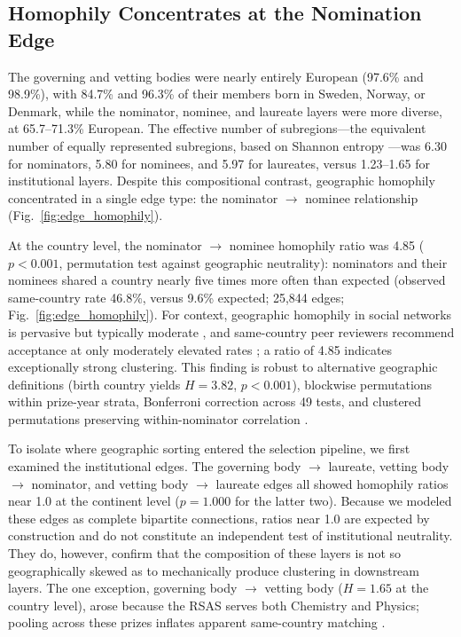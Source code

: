 \documentclass[12pt]{article}
\begin{document}
\subsection*{Homophily Concentrates at the Nomination Edge}

The governing and vetting bodies were nearly entirely European (97.6\% and 98.9\%), with 84.7\% and 96.3\% of their members born in Sweden, Norway, or Denmark, while the nominator, nominee, and laureate layers were more diverse, at 65.7--71.3\% European. The effective number of subregions---the equivalent number of equally represented subregions, based on Shannon entropy \cite{methods}---was 6.30 for nominators, 5.80 for nominees, and 5.97 for laureates, versus 1.23--1.65 for institutional layers. Despite this compositional contrast, geographic homophily concentrated in a single edge type: the nominator $\to$ nominee relationship (Fig.~\ref{fig:edge_homophily}).

At the country level, the nominator $\to$ nominee homophily ratio was 4.85 ($p < 0.001$, permutation test against geographic neutrality): nominators and their nominees shared a country nearly five times more often than expected (observed same-country rate 46.8\%, versus 9.6\% expected; 25,844 edges; Fig.~\ref{fig:edge_homophily}). For context, geographic homophily in social networks is pervasive but typically moderate \cite{McPSmoCoo2001}, and same-country peer reviewers recommend acceptance at only moderately elevated rates \cite{ZumTep2025}; a ratio of 4.85 indicates exceptionally strong clustering. This finding is robust to alternative geographic definitions (birth country yields $H = 3.82$, $p < 0.001$), blockwise permutations within prize-year strata, Bonferroni correction across 49 tests, and clustered permutations preserving within-nominator correlation \cite{methods}.

To isolate where geographic sorting entered the selection pipeline, we first examined the institutional edges. The governing body $\to$ laureate, vetting body $\to$ nominator, and vetting body $\to$ laureate edges all showed homophily ratios near 1.0 at the continent level ($p = 1.000$ for the latter two). Because we modeled these edges as complete bipartite connections, ratios near 1.0 are expected by construction and do not constitute an independent test of institutional neutrality. They do, however, confirm that the composition of these layers is not so geographically skewed as to mechanically produce clustering in downstream layers. The one exception, governing body $\to$ vetting body ($H = 1.65$ at the country level), arose because the RSAS serves both Chemistry and Physics; pooling across these prizes inflates apparent same-country matching \cite{methods}.
\end{document}
